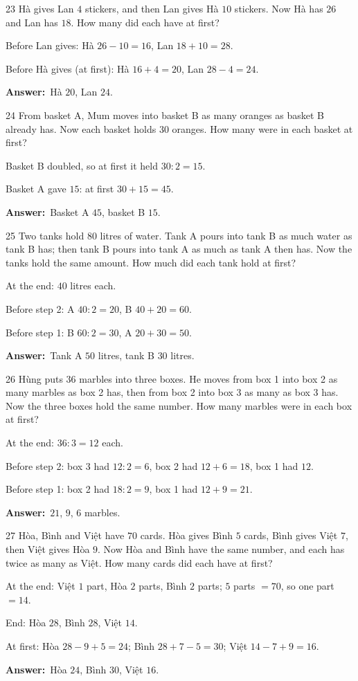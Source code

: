 \documentclass[11pt]{article}
\newif\ifsol \solfalse
\providecommand{\AnsWord}{Đáp số}
\newcommand{\dapso}[1]{\par\textbf{\AnsWord:}\ #1}
\newcommand{\probsol}[1]{%
  \begin{lrbox}{\solmeasure}\begin{minipage}{\dimexpr\linewidth-24pt\relax}#1\end{minipage}\end{lrbox}%
  \ifsol
    \begin{solbox}#1\end{solbox}%
  \else
    \setlength{\solht}{\dimexpr\ht\solmeasure+\dp\solmeasure+0.85cm\relax}%
    \ifdim\solht<1.35cm\setlength{\solht}{1.35cm}\fi
    \begin{tcolorbox}[colback=white,colframe=Line,boxrule=0.8pt,arc=5pt,
      left=8pt,right=8pt,top=4pt,bottom=4pt,height=\solht]{\footnotesize\color{Slate}\itshape\WorkWord}\end{tcolorbox}%
  \fi}
\newcommand{\gap}{\vspace{0.3cm}}
\def\WorkWord{Your work:}
\def\AnsWord{Answer}
\begin{document}
\gap
\begin{probbox}{23}{\relax}
Hà gives Lan $4$ stickers, and then Lan gives Hà $10$ stickers. Now Hà has $26$ and Lan has $18$. How many did each have at first?
\end{probbox}
\probsol{
Before Lan gives: Hà $26-10=16$, Lan $18+10=28$.\par
Before Hà gives (at first): Hà $16+4=20$, Lan $28-4=24$.
\dapso{Hà $20$, Lan $24$.}}
\gap
\begin{probbox}{24}{\relax}
From basket A, Mum moves into basket B as many oranges as basket B already has. Now each basket holds $30$ oranges. How many were in each basket at first?
\end{probbox}
\probsol{
Basket B doubled, so at first it held $30:2=15$.\par Basket A gave $15$: at first $30+15=45$.
\dapso{Basket A $45$, basket B $15$.}}
\gap
\begin{probbox}{25}{\relax}
Two tanks hold $80$ litres of water. Tank A pours into tank B as much water as tank B has; then tank B pours into tank A as much as tank A then has. Now the tanks hold the same amount. How much did each tank hold at first?
\end{probbox}
\probsol{
At the end: $40$ litres each.\par
Before step 2: A $40:2=20$, B $40+20=60$.\par
Before step 1: B $60:2=30$, A $20+30=50$.
\dapso{Tank A $50$ litres, tank B $30$ litres.}}
\gap
\begin{probbox}{26}{\relax}
Hùng puts $36$ marbles into three boxes. He moves from box 1 into box 2 as many marbles as box 2 has, then from box 2 into box 3 as many as box 3 has. Now the three boxes hold the same number. How many marbles were in each box at first?
\end{probbox}
\probsol{
At the end: $36:3=12$ each.\par
Before step 2: box 3 had $12:2=6$, box 2 had $12+6=18$, box 1 had $12$.\par
Before step 1: box 2 had $18:2=9$, box 1 had $12+9=21$.
\dapso{$21$, $9$, $6$ marbles.}}
\gap
\begin{probbox}{27}{\relax}
Hòa, Bình and Việt have $70$ cards. Hòa gives Bình $5$ cards, Bình gives Việt $7$, then Việt gives Hòa $9$. Now Hòa and Bình have the same number, and each has twice as many as Việt. How many cards did each have at first?
\end{probbox}
\probsol{
At the end: Việt $1$ part, Hòa $2$ parts, Bình $2$ parts; $5$ parts $=70$, so one part $=14$.\par
End: Hòa $28$, Bình $28$, Việt $14$.\par
At first: Hòa $28-9+5=24$; Bình $28+7-5=30$; Việt $14-7+9=16$.
\dapso{Hòa $24$, Bình $30$, Việt $16$.}}
\end{document}
